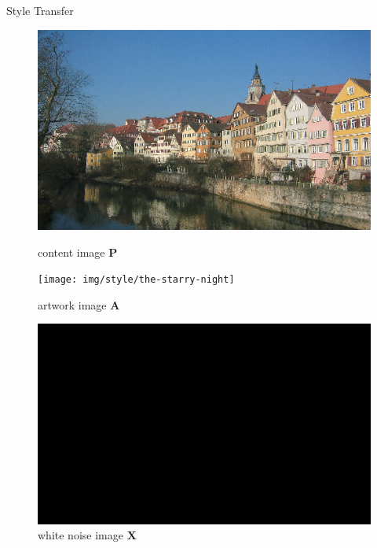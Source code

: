 \documentclass{beamer}
\begin{document}
\begin{frame}{Style Transfer}
\begin{figure}[ht]
    \begin{minipage}[b]{0.34\linewidth}
        \centering
        \includegraphics[width=\textwidth]{img/content/tubingen}
        \caption*{content image $\mathbf{P}$}
    \end{minipage}
    \hspace{0.5cm}
    \begin{minipage}[b]{0.34\linewidth}
        \centering
        \texttt{[image: img/style/the-starry-night]}
        \caption*{artwork image $\mathbf{A}$}
    \end{minipage}
    \hspace{0.5cm}
    \begin{minipage}[b]{0.34\linewidth}
        \centering
        \includegraphics[width=\textwidth]{img/style/noise}
        \caption*{white noise image $\mathbf{X}$}
    \end{minipage}
\end{figure}
\end{frame}
\end{document}
